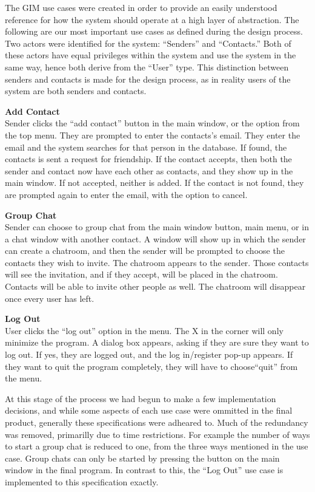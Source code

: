 The GIM use cases were created in order to provide an easily understood reference for how the system should operate at a high layer of abstraction. The following are our most important use cases as defined during the design process. Two actors were identified for the system: ``Senders'' and ``Contacts.'' Both of these actors have equal privileges within the system and use the system in the same way, hence both derive from the ``User'' type. This distinction between senders and contacts is made for the design process, as in reality users of the system are both senders and contacts.

{\bf Add Contact}\\
Sender clicks the ``add contact'' button in the main window, or the option from the top menu. They are prompted to enter the contacts's email. They enter the email and the system searches for that person in the database. If found, the contacts is sent a request for friendship. If the contact accepts, then both the sender and contact now have each other as contacts, and they show up in the main window. If not accepted, neither is added. If the contact is not found, they are prompted again to enter the email, with the option to cancel.

{\bf Group Chat}\\
Sender can choose to group chat from the main window button, main menu, or in a chat window with another contact. A window will show up in which the sender can create a chatroom, and then the sender will be prompted to choose the contacts they wish to invite. The chatroom appears to the sender. Those contacts will see the invitation, and if they accept, will be placed in the chatroom. Contacts will be able to invite other people as well. The chatroom will disappear once every user has left.

{\bf Log Out}\\
User clicks the ``log out'' option in the menu. The X in the corner will only minimize the program. A dialog box appears, asking if they are sure they want to log out. If yes, they are logged out, and the log in/register pop-up appears. If they want to quit the program completely, they will have to choose``quit'' from the menu.

At this stage of the process we had begun to make a few implementation decisions, and while some aspects of each use case were ommitted in the final product, generally these specifications were adheared to. Much of the redundancy was removed, primarilly due to time restrictions. For example the number of ways to start a group chat is reduced to one, from the three ways mentioned in the use case. Group chats can only be started by pressing the button on the main window in the final program. In contrast to this, the ``Log Out'' use case is implemented to this specification exactly.

